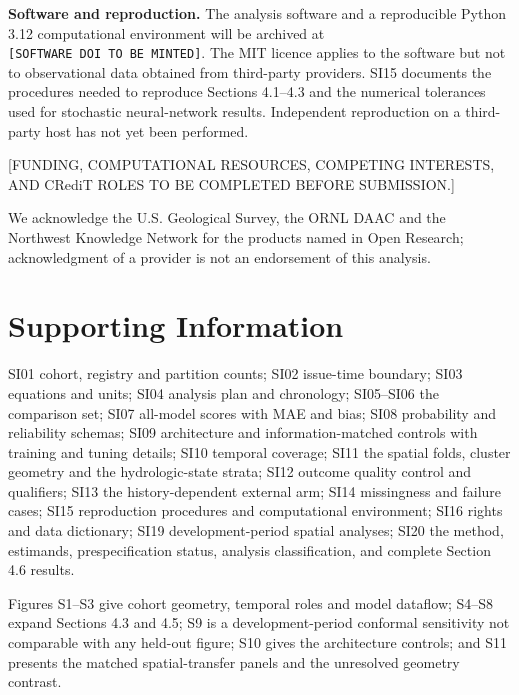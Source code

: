 \textbf{Software and reproduction.} The analysis software and a reproducible
Python 3.12 computational environment will be archived at
\texttt{{[}SOFTWARE\ \allowbreak{}DOI\ \allowbreak{}TO\ \allowbreak{}BE\ \allowbreak{}MINTED{]}}. The MIT licence applies to the software but not
to observational data obtained from third-party providers. SI15 documents the
procedures needed to reproduce Sections 4.1--4.3 and the numerical tolerances
used for stochastic neural-network results. Independent reproduction on a
third-party host has not yet been performed.

\acknowledgments

{[}FUNDING, COMPUTATIONAL RESOURCES, COMPETING INTERESTS, AND CRediT ROLES TO BE
COMPLETED BEFORE SUBMISSION.{]}

We acknowledge the U.S. Geological Survey, the ORNL DAAC and the Northwest
Knowledge Network for the products named in Open Research; acknowledgment of a
provider is not an endorsement of this analysis.

\section*{Supporting Information}

SI01 cohort, registry and partition counts; SI02 issue-time boundary; SI03
equations and units; SI04 analysis plan and chronology; SI05--SI06 the
comparison set; SI07 all-model scores with MAE and bias; SI08 probability and
reliability schemas; SI09 architecture and information-matched controls with
training and tuning details; SI10 temporal coverage; SI11 the spatial folds,
cluster geometry and the hydrologic-state strata; SI12 outcome quality control
and qualifiers; SI13 the history-dependent external arm; SI14 missingness and
failure cases; SI15 reproduction procedures and computational environment; SI16 rights and
data dictionary; SI19 development-period spatial analyses; SI20 the method,
estimands, prespecification status, analysis classification, and complete
Section 4.6 results.

Figures S1--S3 give cohort geometry, temporal roles and model dataflow; S4--S8
expand Sections 4.3 and 4.5; S9 is a development-period conformal sensitivity not
comparable with any held-out figure; S10 gives the architecture controls; and
S11 presents the matched spatial-transfer panels and the unresolved geometry
contrast.

%



